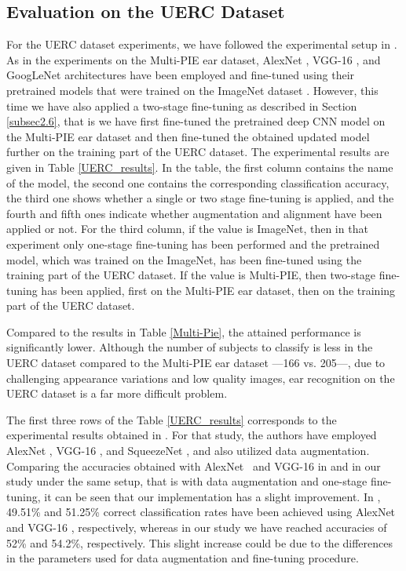 \documentclass[11pt,journal,compsoc]{IEEEtran}
\begin{document}
\subsection{Evaluation on the UERC Dataset}
For the UERC dataset experiments, we have followed the experimental setup in \cite{Emersic_2017_c}. As in the experiments on the Multi-PIE ear dataset, AlexNet \cite{Krizhevsky_2012}, VGG-16 \cite{Simonyan_2014}, and GoogLeNet \cite{Szegedy_2015} architectures have been employed and fine-tuned using their pretrained models that were trained on the ImageNet dataset \cite{Deng_2009}. However, this time we have also applied a two-stage fine-tuning as described in Section \ref{subsec2.6}, that is we have first fine-tuned the pretrained deep CNN model on the Multi-PIE ear dataset and then fine-tuned the obtained updated model further on the training part of the UERC dataset. The experimental results are given in Table \ref{UERC_results}. In the table, the first column contains the name of the model, the second one contains the corresponding classification accuracy, the third one shows whether a single or two stage fine-tuning is applied, and the fourth and fifth ones indicate whether augmentation and alignment have been applied or not. For the third column, if the value is ImageNet, then in that experiment only one-stage fine-tuning has been performed and the pretrained model, which was trained on the ImageNet, has been fine-tuned using the training part of the UERC dataset. If the value is Multi-PIE, then two-stage fine-tuning has been applied, first on the Multi-PIE ear dataset, then on the training part of the UERC dataset.

Compared to the results in Table \ref{Multi-Pie}, the attained performance is significantly lower. Although the number of subjects to classify is less in the UERC dataset compared to the Multi-PIE ear dataset ---166 vs. 205---, due to challenging appearance variations and low quality images, ear recognition on the UERC dataset is a far more difficult problem.

The first three rows of the Table \ref{UERC_results} corresponds to the experimental results obtained in \cite{Emersic_2017_c}. For that study, the authors have employed AlexNet \cite{Krizhevsky_2012}, VGG-16 \cite{Simonyan_2014}, and SqueezeNet \cite{Iandola_2016}, and also utilized data augmentation. Comparing the accuracies obtained with AlexNet~\cite{Krizhevsky_2012} and VGG-16 \cite{Simonyan_2014} in \cite{Emersic_2017_c} and in our study under the same setup, that is with data augmentation and one-stage fine-tuning, it can be seen that our implementation has a slight improvement. In \cite{Emersic_2017_c}, 49.51\% and 51.25\% correct classification rates have been achieved using AlexNet~\cite{Krizhevsky_2012} and VGG-16 \cite{Simonyan_2014}, respectively, whereas in our study we have reached accuracies of 52\% and 54.2\%, respectively. This slight increase could be due to the differences in the parameters used for data augmentation and fine-tuning procedure.
\end{document}
